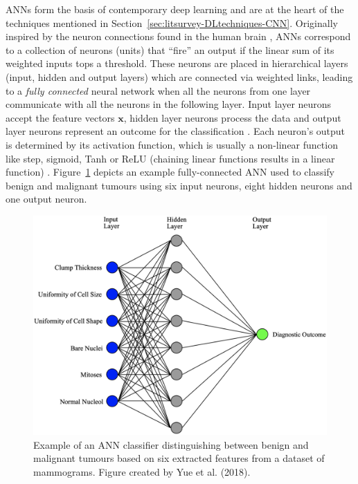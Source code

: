 ANNs form the basis of contemporary deep learning and are at the heart of the techniques mentioned in Section~\ref{sec:litsurvey-DLtechniques-CNN}. Originally inspired by the neuron connections found in the human brain \citep{mcculloch1943logical}, ANNs correspond to a collection of neurons (units) that ``fire'' an output if the linear sum of its weighted inputs tops a threshold. These neurons are placed in hierarchical layers (input, hidden and output layers) which are connected via weighted links, leading to a \textit{fully connected} neural network when all the neurons from one layer communicate with all the neurons in the following layer. Input layer neurons accept the feature vectors $\textbf{x}$, hidden layer neurons process the data and output layer neurons represent an outcome for the classification \citep{russell2002artificial}. Each neuron's output is determined by its activation function, which is usually a non-linear function like step, sigmoid, Tanh or ReLU (chaining linear functions results in a linear function) \citep{Litjens2017}. Figure~\ref{fig:litsurvey-ann-example} depicts an example fully-connected ANN used to classify benign and malignant tumours using six input neurons, eight hidden neurons and one output neuron.\\

\begin{figure}[ht]
\centerline{\includegraphics[width=\textwidth]{figures/litsurvey/ann.png}}
\caption{\label{fig:litsurvey-ann-example}Example of an ANN classifier distinguishing between benign and malignant tumours based on six extracted features from a dataset of mammograms. Figure created by Yue et al. (2018).}
\end{figure}

